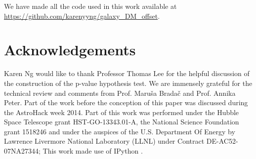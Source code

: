 We have made all the code used in this work available at \\
\href{https://github.com/karenyyng/galaxy\_DM\_offset}{https://github.com/karenyyng/galaxy\_DM\_offset}.

\section{Acknowledgements}
Karen Ng would like to thank Professor Thomas Lee for the helpful discussion of 
the construction of the p-value hypothesis test. We are immensely grateful for 
the technical review and comments from Prof. Maru\v{s}a Brada\v{c} and Prof. Annika Peter.  
Part of the work before the conception of this paper was discussed during 
the AstroHack week 2014. 
Part of this work was performed under the Hubble Space Telescope grant
HST-GO-13343.01-A, the National Science Foundation grant 
1518246 and under the auspices of the U.S. Department Of Energy by 
Lawrence Livermore National Laboratory (LLNL) 
under Contract DE-AC52-07NA27344; 
This work made use of {\sc IPython}
\citep{Perez2007}.

